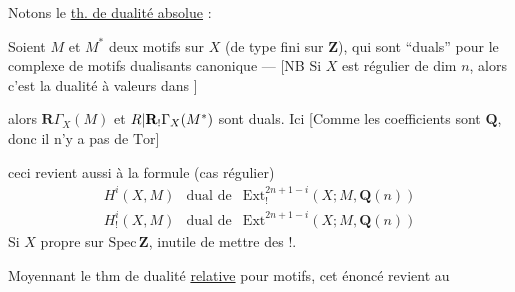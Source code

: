 Notons le \uline{th. de dualité absolue} :

Soient $M$ et $M^*$ deux  motifs sur $X$ (de type fini sur $\mathbf{Z}$), qui sont ``duals'' pour le \deleted{$\unsure{[|\xi}$} complexe de motifs dualisants \deleted{$\unsure{]|\xi}$} canonique --- [NB Si $X$ est régulier  de dim $n$, alors c'est la dualité à valeurs dans ]

alors $\mathbf{R}\Gamma_X(M)$ et $R|\mathbf{R}_!\Gamma_X(M^*)$  sont duals. Ici [Comme les coefficients sont  $\mathbf{Q}$\unsure{\}}, donc il n'y a pas de $\mathrm{Tor}$]

ceci revient aussi à la formule (cas régulier)
\[
\boxed{\begin{array}{lll}
H^i(X,M)&\text{dual de}&\mathrm{Ext}_!^{2n+1-i}(X;M,\mathbf{Q}(n))\\
H^i_!(X,M)&\text{dual de}&\mathrm{Ext}^{2n+1-i}(X;M,\mathbf{Q}(n))
\end{array}}
\]
Si $X$ propre sur $\mathrm{Spec}\,\mathbf{Z}$, inutile de mettre des $!$.

Moyennant le thm de dualité \uline{relative} pour motifs, cet énoncé revient au

